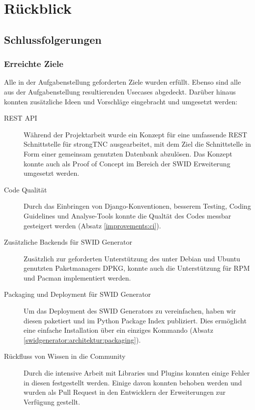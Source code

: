 \chapter{Rückblick}

\section{Schlussfolgerungen}

\subsection{Erreichte Ziele}

Alle in der Aufgabenstellung geforderten Ziele wurden erfüllt. Ebenso sind alle
aus der Aufgabenstellung resultierenden Usecases abgedeckt. Darüber hinaus
konnten zusätzliche Ideen und Vorschläge eingebracht und umgesetzt werden:

\begin{description}                  
                                  
	\item[REST API] Während der Projektarbeit wurde ein Konzept für eine
		umfassende REST Schnittstelle für strongTNC ausgearbeitet, mit dem Ziel die
		Schnittstelle in Form einer gemeinsam genutzten Datenbank abzulösen. Das
		Konzept konnte auch als Proof of Concept im Bereich der SWID Erweiterung
		umgesetzt werden.
	
	\item[Code Qualität] Durch das Einbringen von Django-Konventionen, besserem
		Testing, Coding Guidelines und Analyse-Tools konnte die Qualtät des Codes
		messbar gesteigert werden (Absatz \ref{improvements:ci}).

	\item[Zusätzliche Backends für SWID Generator] Zusätzlich zur geforderten
		Unterstützung des unter Debian und Ubuntu genutzten Paketmanagers DPKG,
		konnte auch die Unterstützung für RPM und Pacman implementiert werden.

	\item[Packaging und Deployment für SWID Generator] Um das Deployment des SWID
		Generators zu vereinfachen, haben wir diesen paketiert und im Python Package
		Index publiziert. Dies ermöglicht eine einfache Installation über ein
		einziges Kommando (Absatz \ref{swidgenerator:architektur:packaging}).

	\item[Rückfluss von Wissen in die Community] Durch die intensive Arbeit mit
		Libraries und Plugins konnten einige Fehler in diesen festgestellt werden.
		Einige davon konnten behoben werden und wurden als Pull Request in den
		Entwicklern der Erweiterungen zur Verfügung gestellt.

\end{description}


